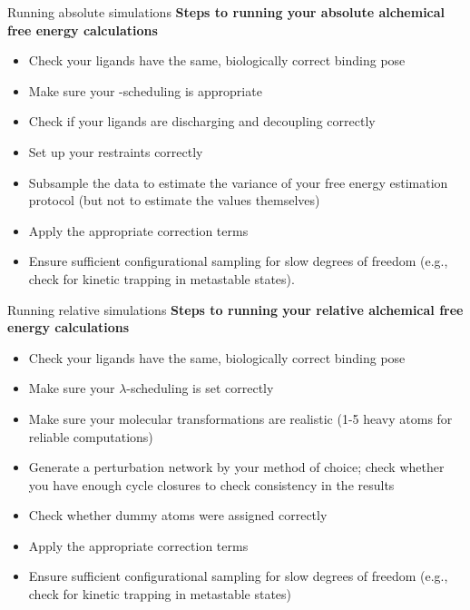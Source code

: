 \documentclass[9pt,bestpractices]{livecoms}
\begin{document}
\begin{Checklists*}
\begin{checklist}{Running absolute simulations}
        \textbf{Steps to running your absolute alchemical free energy calculations}
\begin{itemize}
 \item Check your ligands have the same, biologically correct binding pose
        \item Make sure your \textlambda-scheduling is  appropriate
        \item Check if your ligands are discharging and decoupling correctly
        \item Set up your restraints correctly
        \item Subsample the data to estimate the variance of your free energy estimation protocol (but not to estimate the values themselves)
        \item Apply the appropriate correction terms
        \item Ensure sufficient configurational sampling for slow degrees of freedom (e.g., check for kinetic trapping in metastable states).
\end{itemize}
\end{checklist}

\begin{checklist}{Running relative simulations}
        \textbf{Steps to running your relative alchemical free energy calculations}
\begin{itemize}
   \item Check your ligands  have the same, biologically correct binding pose
        \item Make sure your $\lambda$-scheduling is set correctly
        \item Make sure your molecular transformations are realistic (1-5 heavy atoms for reliable computations)
        \item Generate a perturbation network by your method of choice; check whether you have enough cycle closures to check consistency in the results
        \item Check whether dummy atoms were assigned correctly
         \item Apply the appropriate correction terms
         \item Ensure sufficient configurational sampling for slow degrees of freedom (e.g., check for kinetic trapping in metastable states)
\end{itemize}
\end{checklist}
\end{Checklists*}
\end{document}
